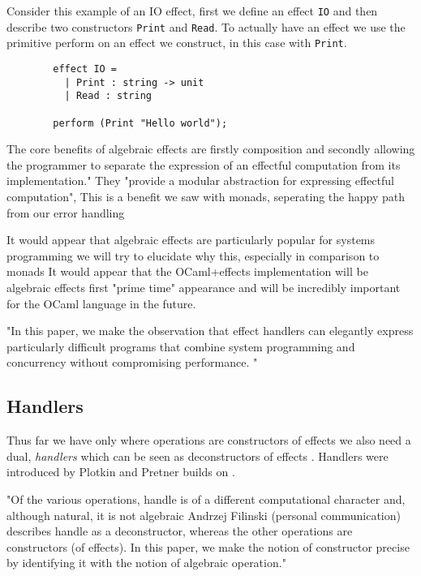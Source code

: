 \begin{example}
    Consider this example of an IO effect,
    first we define an effect \texttt{IO}
    and then describe two constructors
    \texttt{Print} and \texttt{Read}.
    To actually have an effect we use the primitive
    perform on an effect we construct, in this case with \texttt{Print}.
    \begin{verbatim}
        effect IO =
          | Print : string -> unit
          | Read : string

        perform (Print "Hello world");
    \end{verbatim}
\end{example}


The core benefits of algebraic effects are
firstly composition and secondly 
allowing the programmer to separate the expression of an effectful computation from its implementation."
They "provide a modular abstraction for expressing effectful computation"\cite{dolan2015effective},
\cite{dolan2015effective}
This is a benefit we saw with monads,
seperating the happy path from our error handling

It would appear that algebraic effects are particularly popular
for systems programming
\cite{dolan2015effective}
\cite{dolan2017concurrent}
\cite{dolaneffectively}
\cite{Dolan:2017}
we will try to elucidate why this,
especially in comparison to monads
It would appear that the OCaml+effects implementation
will be algebraic effects first "prime time" appearance
and will be incredibly important for the OCaml language in the future.

"In this paper, we make the observation that effect handlers can elegantly express particularly difficult programs that combine system programming and concurrency without compromising performance. "
\cite{Dolan:2017}

\subsection{Handlers}
Thus far we have only
where operations are constructors of effects
we also need a dual,
\textit{handlers} which can be seen as deconstructors of effects
\cite{}.
Handlers were introduced by Plotkin and Pretner\cite{Plotkin:2009dr}
builds on
\cite{benton2001exceptional}
.

"Of the various operations, handle is of a different computational character and, although natural, it is not algebraic
Andrzej Filinski (personal communication) describes handle as a deconstructor, whereas the other operations are constructors (of effects). In this paper, we make the notion of constructor precise by identifying it with the notion of algebraic operation."
\cite{Plotkin:2002dw}


